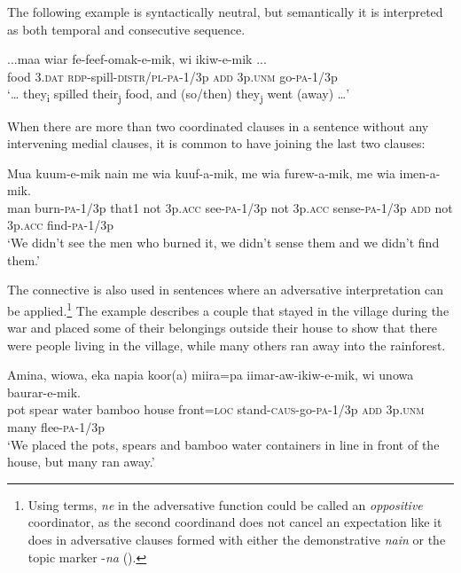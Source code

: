 The following example  is syntactically neutral, but semantically it is interpreted as both temporal and consecutive sequence.

\ea%
\label{ex:8:x1373}
\gll ...maa  wiar  fe-feef-omak-e-mik,    wi  ikiw-e-mik ...\\
food  3.\textsc{dat} \textsc{rdp}-spill-\textsc{distr}/\textsc{pl}-\textsc{pa}-1/3p  \textsc{add}  3p.\textsc{unm} go-\textsc{pa}-1/3p   \\
\glt`{\dots} they\textsubscript{i} spilled their\textsubscript{j} food, and (so/then) they\textsubscript{j} went (away) {\dots}'
\z


When there are more than two coordinated clauses in a sentence without any intervening medial clauses, it is common to have   joining the last two clauses:

\ea%
\label{ex:8:x1374}
\gll Mua  kuum-e-mik  nain  me  wia  kuuf-a-mik,  me wia  furew-a-mik,    me  wia  imen-a-mik. \\
man  burn-\textsc{pa}-1/3p  that1  not  3p.\textsc{acc}  see-\textsc{pa}-1/3p  not 3p.\textsc{acc}  sense-\textsc{pa}-1/3p  \textsc{add}  not  3p.\textsc{acc}  find-\textsc{pa}-1/3p     \\
\glt`We didn't see the men who burned it, we didn't sense them and we didn't find them.'
\z


The connective   is also used in sentences where an adversative interpretation can be applied.\footnote{Using  terms, \textit{ne} in the adversative function could be called an \textit{oppositive} coordinator, as the second coordinand does not cancel an expectation like it does in adversative clauses formed with either the demonstrative \textit{nain} or the topic marker -\textit{na} ().}  The example  describes a couple that stayed in the village during the war and placed some of their belongings outside their house to show that there were people living in the village, while many others ran away into the rainforest. 

\ea%
\label{ex:8:x1375}
\gll Amina,  wiowa,  eka  napia  koor(a)  miira=pa iimar-aw-ikiw-e-mik,    wi  unowa  baurar-e-mik. \\
pot  spear  water  bamboo  house  front=\textsc{loc} stand-\textsc{caus}-go-\textsc{pa}-1/3p  \textsc{add}  3p.\textsc{unm}  many  flee-\textsc{pa}-1/3p    \\
\glt`We placed the pots, spears and bamboo water containers in line in front of the house, but many ran away.'
\z


